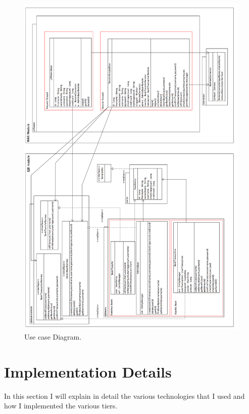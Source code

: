 \documentclass[a4paper]{article}
\begin{document}
\begin{figure}[ht]
  \centering
  \includegraphics[keepaspectratio=true, width=\textwidth, height=\textheight]{ClassDiagram2.png}\caption{Use case Diagram.}
  \label{fig:classdiagram}
\end{figure}

\section{Implementation Details}
\label{sec:impl_details}
In this section I will explain in detail the various technologies that I used and how I implemented the various tiers. 
\end{document}
